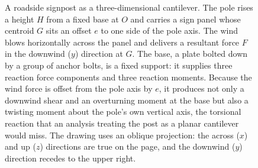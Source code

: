 \begin{figure}[htbp]
\caption[Cantilevered signpost under wind load]{A roadside signpost as a
three-dimensional cantilever. The pole rises a height $H$ from a fixed base
at $O$ and carries a sign panel whose centroid $G$ sits an offset $e$ to one
side of the pole axis. The wind blows horizontally across the panel and
delivers a resultant force $F$ in the downwind ($y$) direction at $G$. The
base, a plate bolted down by a group of anchor bolts, is a fixed support: it
supplies three reaction force components and three reaction moments. Because
the wind force is offset from the pole axis by $e$, it produces not only a
downwind shear and an overturning moment at the base but also a twisting
moment about the pole's own vertical axis, the torsional reaction that an
analysis treating the post as a planar cantilever would miss. The drawing
uses an oblique projection: the across ($x$) and up ($z$) directions are
true on the page, and the downwind ($y$) direction recedes to the upper
right.}
\label{fig:vol03ch02:signpost-3d}
\end{figure}
